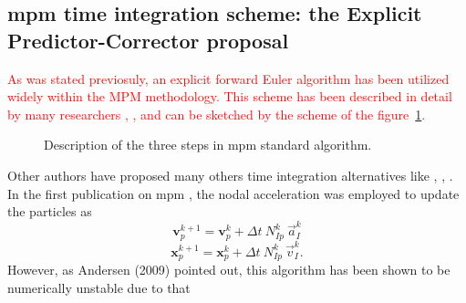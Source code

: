 \documentclass[preprint,12pt,a4paper]{elsarticle}
\newcommand{\vect}[1]{
  \ensuremath{\mathbf{{#1}}}
}
\newcommand{\PNA}[1]{
  \textcolor{red}{{#1}}
}
\begin{document}
\subsection{\acrshort{mpm} time integration scheme: the Explicit Predictor-Corrector proposal}
\label{sec:epc-algor-mpm}

\PNA{As was stated previosuly, an explicit forward Euler algorithm has been utilized widely within the \acrshort{MPM} methodology. This scheme has been described in detail by many researchers
\cite{Sulsky1994}, \cite{Bardenhagen2002}, \cite{thesis_Andersen_2009} and can be sketched by the scheme of the figure~\ref{fig:MPM_algorithm}.}
\begin{figure}\sidecaption
  \centering
  \caption{Description of the three steps in \acrshort{mpm} standard algorithm.}
  \label{fig:MPM_algorithm}
\end{figure}
Other authors have proposed many others time integration alternatives
like \cite{Guilkey2003}, \cite{Tran2019e}, \cite{Charlton2017}. In the
first publication on \acrshort{mpm} \cite{Sulsky1994}, the nodal acceleration
was employed to update the particles as
\begin{equation}
  \label{eq:Sulsky-1994-UL-v}
  \vect{v}_p^{k+1} = \vect{v}_p^{k} + \Delta t\ N_{Ip}^{k}\ \vec{a}_{I}^{k}
\end{equation}
\begin{equation}
  \label{eq:Sulsky-1994-UL-x}
  \vect{x}_p^{k+1} = \vect{x}_p^{k} + \Delta t\ N_{Ip}^{k}\ \vec{v}_{I}^{k}.
\end{equation}
However, as Andersen (2009)\cite{thesis_Andersen_2009} pointed out, this algorithm has been shown to be numerically unstable due to that
\end{document}
